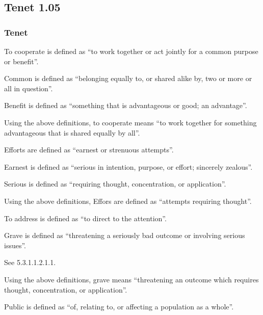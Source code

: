 \subsection{Tenet 1.05}
\subsubsection{Tenet}


To cooperate is defined as ``to work together or act jointly for a common purpose or benefit''\cite{dictionary_com}.


Common is defined as ``belonging equally to, or shared alike by, two or more or all in question''\cite{dictionary_com}.

Benefit is defined as ``something that is advantageous or good; an advantage''\cite{dictionary_com}.

Using the above definitions, to cooperate means ``to work together for something advantageous that is shared equally by all''.

Efforts are defined as ``earnest or strenuous attempts''\cite{dictionary_com}.

Earnest is defined as ``serious in intention, purpose, or effort; sincerely zealous''\cite{dictionary_com}.

Serious is defined as ``requiring thought, concentration, or application''\cite{dictionary_com}.

Using the above definitions, Effors are defined as ``attempts requiring thought''.

To address is defined as ``to direct to the attention''\cite{dictionary_com}.

Grave is defined as ``threatening a seriously bad outcome or involving serious issues''\cite{dictionary_com}.

See 5.3.1.1.2.1.1.

Using the above definitions, grave means ``threatening an outcome which requires thought, concentration, or application''.

Public is defined as ``of, relating to, or affecting a population as a whole''\cite{dictionary_com}.


